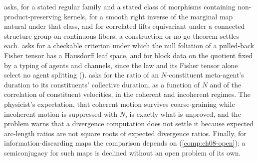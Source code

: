  asks, for a stated regular family and a stated class of morphisms
containing non-product-preserving kernels, for a smooth right inverse of the marginal map natural under
that class, and for correlated lifts equivariant under a connected structure group on continuous
fibers; a construction or no-go theorem settles each.  asks for a
checkable criterion under which the null foliation of a pulled-back Fisher tensor has a Hausdorff leaf
space, and for block data on the quotient fixed by a typing of agents and channels, since the law and
its Fisher tensor alone select no agent splitting ().
 asks for the ratio of an $N$-constituent meta-agent's duration to its
constituents' collective duration, as a function of $N$ and of the correlation of constituent
velocities, in the coherent and incoherent regimes. The physicist's expectation, that coherent motion
survives coarse-graining while incoherent motion is suppressed with $N$, is exactly what is unproved,
and the problem warns that a divergence computation does not settle it because expected arc-length
ratios are not square roots of expected divergence ratios. Finally, for information-discarding maps
the comparison depends on  (\cref{comp:ch08-open}); a semiconjugacy for
such maps is declined without an open problem of its own.

